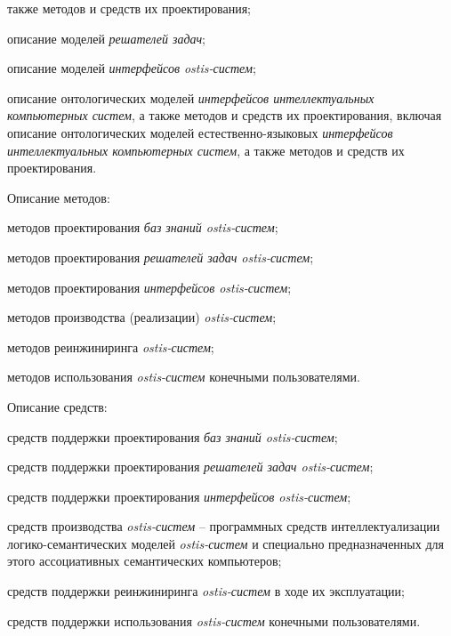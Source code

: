\begin{SCn}
{\begin{scnitemize}
\begin{scnitemizeii}
\begin{scnitemizeiii}
					также методов и средств их проектирования;
					\item описание моделей \textit{решателей задач};
					\item описание моделей \textit{интерфейсов ostis-систем};
					\item описание онтологических моделей \textit{интерфейсов
						интеллектуальных компьютерных систем}, а также методов и средств их
					проектирования, включая описание онтологических моделей естественно-языковых
					\textit{интерфейсов интеллектуальных компьютерных систем}, а также методов и
					средств их проектирования.
				\end{scnitemizeiii}
				\item Описание методов:
				\begin{scnitemizeiii}
					\item методов проектирования \textit{баз знаний ostis-систем};
					\item методов проектирования \textit{решателей задач ostis-систем};
					\item методов проектирования \textit{интерфейсов ostis-систем};
					\item методов производства (реализации) \textit{ostis-систем};
					\item методов реинжиниринга \textit{ostis-систем};
					\item методов использования \textit{ostis-систем} конечными
					пользователями.
				\end{scnitemizeiii}
				\item Описание средств:
				\begin{scnitemizeiii}
					\item средств поддержки проектирования \textit{баз знаний
						ostis-систем};
					\item средств поддержки проектирования \textit{решателей задач
						ostis-систем};
					\item средств поддержки проектирования \textit{интерфейсов
						ostis-систем};
					\item средств производства \textit{ostis-систем} -- программных средств
					интеллектуализации логико-семантических моделей \textit{ostis-систем} и
					специально предназначенных для этого ассоциативных семантических компьютеров;
					\item средств поддержки реинжиниринга \textit{ostis-систем} в ходе их
					эксплуатации;
					\item средств поддержки использования \textit{ostis-систем} конечными
					пользователями.
				\end{scnitemizeiii}

\end{scnitemizeii}
\end{scnitemize}}
\end{SCn}
